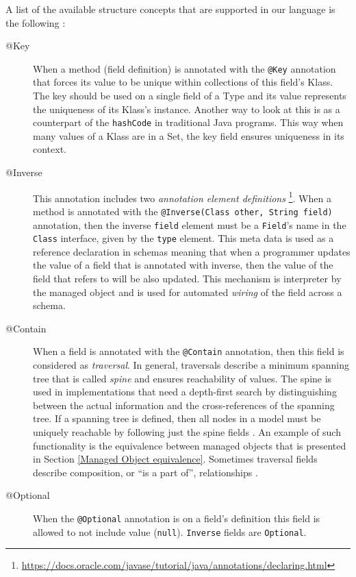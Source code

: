 A list of the available structure concepts that are supported in our language is the following \cite{loh2012managed}:
\begin{description}
	\item [@Key] When a method (field definition) is annotated with the \texttt{@Key} annotation that forces its value to be unique within collections of this field's Klass.
	The key should be used on a single field of a Type and its value represents the uniqueness of its Klass's instance.
	Another way to look at this is as a counterpart of the \texttt{hashCode} in traditional Java programs.
	This way when many values of a Klass are in a Set, the key field ensures uniqueness in its context.

	\item [@Inverse] This annotation includes two \textit{annotation element definitions} \footnote{
		\url{https://docs.oracle.com/javase/tutorial/java/annotations/declaring.html}}.
	When a method is annotated with the \texttt{@Inverse(Class other, String field)} annotation, then the inverse \texttt{field} element must be a \texttt{Field}'s name in the \texttt{Class} interface, given by the \texttt{type} element.
	This meta data is used as a reference declaration in schemas meaning that when a programmer updates the value of a field that is annotated with inverse, then the value of the field that refers to will be also updated.
	This mechanism is interpreter by the managed object and is used for automated \textit{wiring} of the field across a schema.

	\item [@Contain] When a field is annotated with the \texttt{@Contain} annotation, then this field is considered as \textit{traversal}. 
	In general, traversals describe a minimum spanning tree that is called \textit{spine} and ensures reachability of values.
	The spine is used in implementations that need a depth-first search by distinguishing between the actual information and the cross-references of the spanning tree.
	If a spanning tree is defined, then all nodes in a model must be uniquely reachable by following just the spine fields \cite{storm2012object}.
	An example of such functionality is the equivalence between managed objects that is presented in Section \ref{Managed Object equivalence}.
	Sometimes traversal fields describe composition, or ``is a part of'', relationships \cite{loh2012managed}.

	\item [@Optional] When the \texttt{@Optional} annotation is on a field's definition this field is allowed to not include value (\texttt{null}).
	\texttt{Inverse} fields are \texttt{Optional}. 


\end{description}
